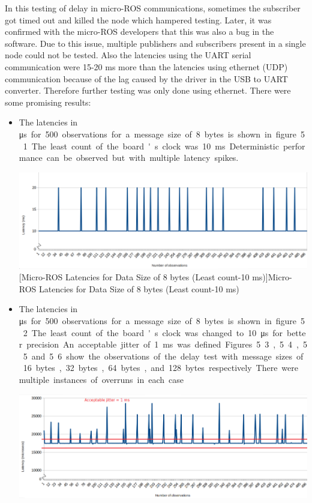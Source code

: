\documentclass[%
xelatex,
	oneside,		%
	12pt,			%
	parskip=half,	%
	abstracton,
	chapterprefix=true%
    appendixprefix=true]
{scrbook}
\begin{document}
\vspace*{0.5cm}
In this testing of delay in micro-ROS communications, sometimes the subscriber got timed out and killed the node which hampered testing. Later, it was confirmed with the micro-ROS developers that this was also a bug in the software. Due to this issue, multiple publishers and subscribers present in a single node could not be tested. Also the latencies using the UART serial communication were 15-20 ms more than the latencies using ethernet (UDP) communication because of the lag caused by the driver in the USB to UART converter. Therefore further testing was only done using ethernet. There were some promising results:
\begin{itemize}
\item The latencies in \si\micro s for 500 observations for a message size of 8 bytes is shown in figure 5.1. The least count of the board's clock was 10 ms. Deterministic performance can be observed but with multiple latency spikes.

\begin{center}
\includegraphics[scale=0.345]{fig/uros8byteles2.png}
[Micro-ROS Latencies for Data Size of 8 bytes (Least count-10 ms)]{Micro-ROS Latencies for Data Size of 8 bytes (Least count-10 ms)}
\label{fig:uros8byteles}
\end{center}

\item The latencies in \si\micro s for 500 observations for a message size of 8 bytes is shown in figure 5.2. The least count of the board's clock was changed to 10 \si\micro s for better precision. An acceptable jitter of 1 ms was defined. Figures 5.3, 5.4, 5.5 and 5.6 show the observations of the delay test with message sizes of 16 bytes, 32 bytes, 64 bytes, and 128 bytes respectively. There were multiple instances of overruns in each case.
\begin{center}
\includegraphics[scale=0.34]{fig/uros8byte2.png}


\end{center}
\end{itemize}
\end{document}
